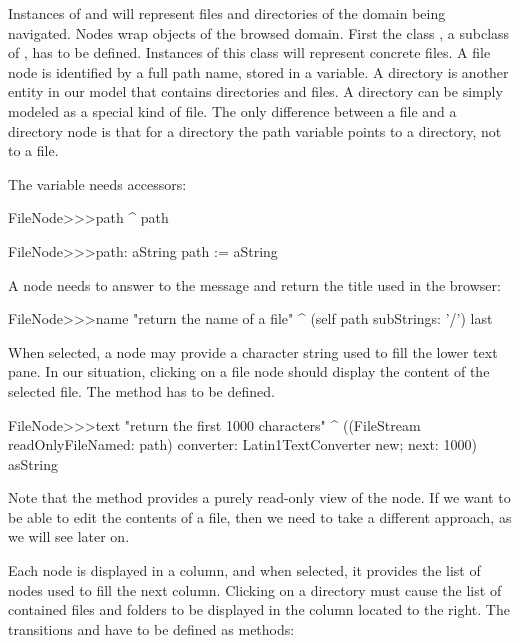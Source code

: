 \documentclass[a4paper,10pt,twoside]{book}
\begin{document}
Instances of  and  will represent files and directories of the domain being navigated. 
Nodes wrap objects of the browsed domain. First the class , a subclass of , has to be defined. Instances of this class will represent concrete files. A file node is identified by a full path name, stored in a variable. A directory is another entity in our model that contains directories and files. A directory can be simply modeled as a special kind of file. The only difference between a file and a directory node is that for a directory the path variable points to a directory, not to a file. 

The  variable needs accessors:

\begin{code}{}    
FileNode>>>path
	^ path

FileNode>>>path: aString
	path := aString
\end{code}

A node needs to answer to the message  and return the title used in the browser:

\begin{code}{}    
FileNode>>>name
	"return the name of a file"
	^ (self path subStrings: '/') last
\end{code}

When selected, a node may provide a character string used to fill the lower text pane. In our situation, clicking on a file node should display the content of the selected file. The method  has to be defined. 

\begin{code}{}    
FileNode>>>text
	"return the first 1000 characters"
     ^ ((FileStream readOnlyFileNamed: path) converter: Latin1TextConverter new; 
              next: 1000) asString
\end{code}

Note that the method  provides a purely read-only view of the node.
If we want to be able to edit the contents of a file, then we need to take a different approach, as we will see later on.

Each node is displayed in a column, and when selected, it provides the list of nodes used to fill the next column. Clicking on a directory must cause the list of contained files and folders to be displayed in the column located to the right. The transitions  and  have to be defined as methods:
\end{document}
